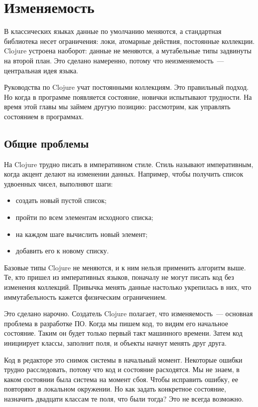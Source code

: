 \chapter{Изменяемость}

\begin{teaser}
В классических языках данные по умолчанию меняются, а стандартная библиотека
несет ограничения: локи, атомарные действия, постоянные коллекции. Clojure
устроена наоборот: данные не меняются, а мутабельные типы задвинуты на второй
план. Это сделано намеренно, потому что неизменяемость~--- центральная идея
языка.
\end{teaser}

Руководства по Clojure учат постоянными коллекциям. Это правильный подход. Но
когда в программе появляется состояние, новички испытывают трудности. На время
этой главы мы займем другую позицию: рассмотрим, как управлять состоянием в
программах.

\section{Общие проблемы}

На Clojure трудно писать в императивном стиле. Стиль называют императивным,
когда акцент делают на изменении данных. Например, чтобы получить список
удвоенных чисел, выполняют шаги:

\begin{itemize}
\item
  создать новый пустой список;
\item
  пройти по всем элементам исходного списка;
\item
  на каждом шаге вычислить новый элемент;
\item
  добавить его к новому списку.
\end{itemize}

Базовые типы Clojure не меняются, и к ним нельзя применить алгоритм выше. Те,
кто пришел из императивных языков, поначалу не могут писать код без изменения
коллекций. Привычка менять данные настолько укрепилась в них, что
иммутабельность кажется физическим ограничением.

Это сделано нарочно. Создатель Clojure полагает, что изменяемость~--- основная
проблема в разработке ПО. Когда мы пишем код, то видим его начальное
состояние. Таким он будет только первый такт машинного времени. Затем код
инициирует классы, заполнит поля, и объекты начнут менять друг друга.

Код в редакторе это снимок системы в начальный момент. Некоторые ошибки трудно
расследовать, потому что код и состояние расходятся. Мы не знаем, в каком
состоянии была система на момент сбоя. Чтобы исправить ошибку, ее повторяют в
локальном окружении. Но как задать конкретное состояние, назначить двадцати
классам те поля, что были тогда? Это не всегда возможно.

